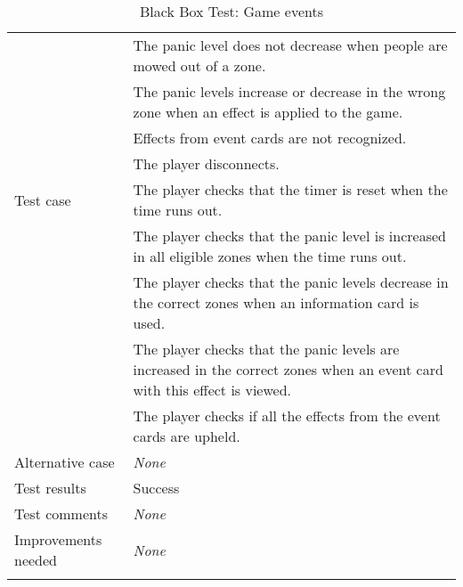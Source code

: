 {\begin{longtable}[l]{| p{5cm} | p{10cm} |}
		& The panic level does not decrease when people are mowed out of a zone.\\
		& The panic levels increase or decrease in the wrong zone when an effect is applied to the game.\\
		& Effects from event cards are not recognized.\\
		& The player disconnects.\\ \hline
	Test case
		& The player checks that the timer is reset when the time runs out.\\
		& The player checks that the panic level is increased in all eligible zones when the time runs out.\\
		& The player checks that the panic levels decrease in the correct zones when an information card is used.\\
		& The player checks that the panic levels are increased in the correct zones when an event card with this effect is viewed. \\
		& The player checks if all the effects from the event cards are upheld. \\ \hline
	Alternative case
		& \emph{None}\\ \hline
	Test results 
		& Success \\ \hline
	Test comments
		& \emph{None} \\ \hline
	Improvements needed
		& \emph{None} \\ \hline


\caption{Black Box Test: Game events}
\label{fig:black_box_test_6}
\end{longtable}}



